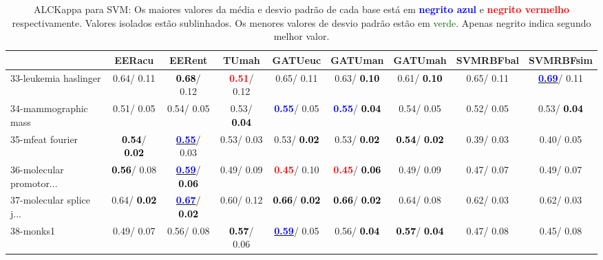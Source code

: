 \begin{table}[h]
\caption{ALCKappa para SVM: Os maiores valores da média e desvio padrão de cada base está em \textcolor{blue}{\textbf{negrito azul}} e \textcolor{red}{\textbf{negrito vermelho}} respectivamente. Valores isolados estão sublinhados. Os menores valores de desvio padrão estão em \textcolor{darkgreen}{verde}. Apenas negrito indica segundo melhor valor.}
\begin{center}\begin{tabular}{lc|c|c|c|c|c|c|c}
 & EERacu & EERent & TUmah & \textbf{GATUeuc} & \textbf{GATUman} & \textbf{GATUmah} & SVMRBFbal & SVMRBFsim\\ \hline 33-leukemia haslinger &   0.64/  0.11 & \textcolor{black}{\textbf{  0.68}}/  0.12 & \textcolor{red}{\textbf{  0.51}}/  0.12 &   0.65/  0.11 &   0.63/\textcolor{black}{\textbf{  0.10}} &   0.61/\textcolor{black}{\textbf{  0.10}} &   0.65/  0.11 & \underline{\textcolor{blue}{\textbf{  0.69}}}/  0.11 \\
34-mammographic mass &   0.51/  0.05 &   0.54/  0.05 &   0.53/\textcolor{black}{\textbf{  0.04}} & \textcolor{blue}{\textbf{  0.55}}/  0.05 & \textcolor{blue}{\textbf{  0.55}}/\textcolor{black}{\textbf{  0.04}} &   0.54/  0.05 &   0.52/  0.05 &   0.53/\textcolor{black}{\textbf{  0.04}} \\
35-mfeat fourier & \textcolor{black}{\textbf{  0.54}}/\textcolor{black}{\textbf{  0.02}} & \underline{\textcolor{blue}{\textbf{  0.55}}}/  0.03 &   0.53/  0.03 &   0.53/\textcolor{black}{\textbf{  0.02}} &   0.53/\textcolor{black}{\textbf{  0.02}} & \textcolor{black}{\textbf{  0.54}}/\textcolor{black}{\textbf{  0.02}} &   0.39/  0.03 &   0.40/  0.05 \\
36-molecular promotor... & \textcolor{black}{\textbf{  0.56}}/  0.08 & \underline{\textcolor{blue}{\textbf{  0.59}}}/\textcolor{black}{\textbf{  0.06}} &   0.49/  0.09 & \textcolor{red}{\textbf{  0.45}}/  0.10 & \textcolor{red}{\textbf{  0.45}}/\textcolor{black}{\textbf{  0.06}} &   0.49/  0.09 &   0.47/  0.07 &   0.49/  0.07 \\
37-molecular splice j... &   0.64/\textcolor{black}{\textbf{  0.02}} & \underline{\textcolor{blue}{\textbf{  0.67}}}/\textcolor{black}{\textbf{  0.02}} &   0.60/  0.12 & \textcolor{black}{\textbf{  0.66}}/\textcolor{black}{\textbf{  0.02}} & \textcolor{black}{\textbf{  0.66}}/\textcolor{black}{\textbf{  0.02}} &   0.64/  0.08 &   0.62/  0.03 &   0.62/  0.03 \\
38-monks1 &   0.49/  0.07 &   0.56/  0.08 & \textcolor{black}{\textbf{  0.57}}/  0.06 & \underline{\textcolor{blue}{\textbf{  0.59}}}/  0.05 &   0.56/\textcolor{black}{\textbf{  0.04}} & \textcolor{black}{\textbf{  0.57}}/\textcolor{black}{\textbf{  0.04}} &   0.47/  0.08 &   0.45/  0.08 \\

\end{tabular}
\end{center}
\end{table}
